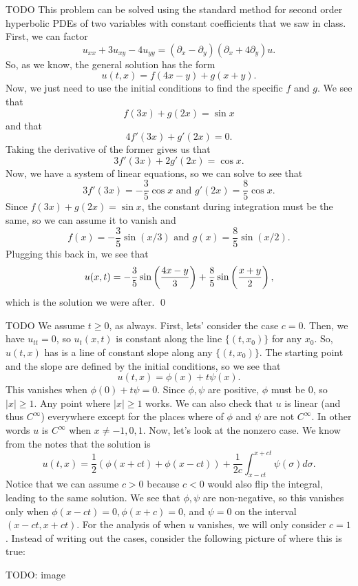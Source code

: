 \documentclass{article}
\renewcommand{\d}{\partial}
\begin{document}
\newpage
{} TODO \tri
\hop
\solution This problem can be solved using the standard method for second order hyperbolic PDEs of two variables with constant coefficients that we saw in class. 
\hop 
First, we can factor 
\[u_{xx} + 3u_{xy} -4u_{yy} = (\d_x - \d_y)(\d_x + 4\d_y)u.\]
So, as we know, the general solution has the form 
\[u(t,x) = f(4x - y)+ g(x+y).\]
Now, we just need to use the initial conditions to find the specific $f$ and $g$. We see that 
\[f(3x)+g(2x) = \sin x\]
and that 
\[4f'(3x) + g'(2x) = 0.\]
Taking the derivative of the former gives us that 
\[3f'(3x)+2g'(2x) = \cos x.\]
Now, we have a system of linear equations, so we can solve to see that 
\[3f'(3x) = - \frac{3}{5}\cos x \text{ and } g'(2x) = \frac{8}{5} \cos x .\]
Since $f(3x) + g(2x) = \sin x$, the constant during integration must be the same, so we can assume it to vanish and
\[f(x) = -\frac{3}{5}\sin(x/3) \text{ and } g(x) = \frac{8}{5}\sin(x/2).\]
Plugging this back in, we see that 
\[u(x,t) =  -\frac{3}{5}\sin\del{\frac{4x-y}{3}} + \frac{8}{5}\sin\del{\frac{x+y}{2}},\]
which is the solution we were after. \qed


\newpage
{} TODO \tri
\hop
\solution
We assume $t \ge 0$, as always. First, lets' consider the case $c =0$. Then, we have $u_{tt} = 0$, so $u_t(x,t)$ is constant along the line $\{(t,x_0)\}$ for any $x_0$. So, $u(t,x)$ has is a line of constant slope along any $\{(t,x_0)\}$. The starting point and the slope are defined by the initial conditions, so we see that 
\[u(t,x) = \phi(x) + t\psi(x).\]
This vanishes when $\phi(0) + t\psi =0$. Since $\phi, \psi$ are positive, $\phi$ must be $0$, so $|x| \ge 1$. Any point where $|x| \ge 1$ works. 
\hop 
We can also check that $u$ is linear (and thus $C^\infty$) everywhere except for the places where of $\phi$ and $\psi$ are not $C^\infty$. In other words $u$ is $C^\infty$ when $x \ne -1,0,1$. 
\hop
Now, let's look at the nonzero case. We know from the notes that the solution is 
\[u(t,x) = \frac{1}{2}(\phi(x+ct) + \phi(x-ct)) + \frac{1}{2c}\int_{x-ct}^{x+ct}\psi(\sigma) d\sigma.\]
Notice that we can assume $c > 0$ because $c < 0$ would also flip the integral, leading to the same solution. 
\hop 
We see that $\phi, \psi$ are non-negative, so this vanishes only when $\phi(x-ct)=0, \phi(x+c)=0$, and $\psi = 0$ on the interval $(x-ct,x+ct)$. For the analysis of when $u$ vanishes, we will only consider $c =1$.  Instead of writing out the cases, consider the following picture of where this is true:

TODO: image
\end{document}
